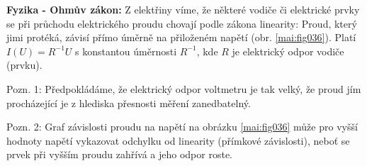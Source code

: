 \begin{mdframed}[style=mdexam]
  \begin{example}\label{mai:exam035}
    \textbf{Fyzika - Ohmův zákon:}\newline
    Z elektřiny víme, že některé vodiče či elektrické prvky se při průchodu elektrického proudu 
    chovají podle zákona linearity: Proud, který jimi protéká, závisí přímo úměrně na přiloženém 
    napětí (obr. \ref{mai:fig036}). Platí \(I(U) = R^{-1 }U\) s konstantou úměrnosti \(R^{-1}\), kde 
    \(R\) je elektrický odpor vodiče (prvku).

    Pozn. 1: Předpokládáme, že elektrický odpor voltmetru je tak velký, že proud jím procházející je 
    z hlediska přesnosti měření zanedbatelný.
    
    Pozn. 2: Graf závislosti proudu na napětí na obrázku \ref{mai:fig036} může pro vyšší hodnoty 
    napětí vykazovat odchylku od linearity (přímkové závislosti), neboť se prvek při vyšším proudu 
    zahřívá a jeho odpor roste.
    
    {\centering
      \captionsetup{type=figure}
      \par}  
  \end{example}
\end{mdframed}